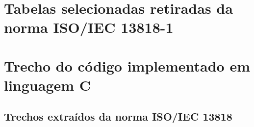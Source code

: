 \documentclass[
	12pt,				%
	openright,			%
	twoside,			%
	a4paper,			%
	english,			%
	french,				%
	brazil				%
	]{abntex2}
\begin{document}
\begin{apendicesenv}

\partapendices

\chapter{Tabelas selecionadas retiradas da norma ISO/IEC 13818-1}

\lipsum[50]

\chapter{Trecho do código implementado em linguagem C}
\lipsum[55]

\end{apendicesenv}



\begin{anexosenv}

\partanexos

\chapter{Trechos extraídos da norma ISO/IEC 13818}





\end{anexosenv}

\printindex
\end{document}
